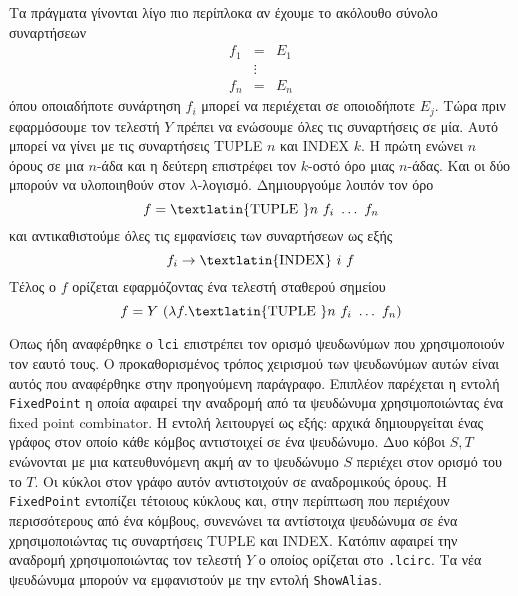 \documentclass[a4paper,11pt]{article}
\newcommand{\la}{$\lambda$}
\newcommand{\lci}{\texttt{\en{lci}}}
\newcommand{\kwd}[1]{\en{\texttt{#1}}}
\newcommand{\en}[1]{\textlatin{#1}}
\begin{document}
Τα πράγματα γίνονται λίγο πιο περίπλοκα αν έχουμε το ακόλουθο σύνολο συναρτήσεων
\begin{eqnarray*}
	f_1 & = & E_1 \\
	& \vdots \\
	f_n & = & E_n
\end{eqnarray*}
όπου οποιαδήποτε συνάρτηση $f_i$ μπορεί να περιέχεται σε οποιοδήποτε $E_j$. Τώρα
πριν εφαρμόσουμε τον τελεστή $Y$ πρέπει να ενώσουμε όλες τις συναρτήσεις σε μία.
Αυτό μπορεί να γίνει με τις συναρτήσεις \en{TUPLE} $n$ και \en{INDEX} $k$. Η πρώτη
ενώνει $n$ όρους σε μια $n$-άδα και η δεύτερη επιστρέφει τον $k$-οστό όρο μιας $n$-άδας.
Και οι δύο μπορούν να υλοποιηθούν στον \la-λογισμό. Δημιουργούμε λοιπόν τον όρο
\[ f = \textrm{\en{TUPLE }} n\ f_i \ \dots\ f_n \]
και αντικαθιστούμε όλες τις εμφανίσεις των συναρτήσεων ως εξής
\[ f_i \rightarrow \textrm{\en{INDEX}}\ i\ f \]
Τέλος ο $f$ ορίζεται εφαρμόζοντας ένα τελεστή σταθερού σημείου
\[ f = Y\ (\lambda f.\textrm{\en{TUPLE }} n\ f_i \ \dots\ f_n ) \]

Οπως ήδη αναφέρθηκε ο \lci{} επιστρέπει τον ορισμό ψευδωνύμων που χρησιμοποιούν τον
εαυτό τους. Ο προκαθορισμένος τρόπος χειρισμού των ψευδωνύμων αυτών είναι αυτός που
αναφέρθηκε στην προηγούμενη παράγραφο. Επιπλέον παρέχεται η εντολή \kwd{FixedPoint}
η οποία αφαιρεί την αναδρομή από τα ψευδώνυμα χρησιμοποιώντας ένα \en{fixed point
combinator}. Η εντολή λειτουργεί ως εξής:
αρχικά δημιουργείται ένας γράφος στον οποίο κάθε κόμβος αντιστοιχεί σε ένα ψευδώνυμο.
Δυο κόβοι $S,T$ ενώνονται με μια κατευθυνόμενη ακμή αν το ψευδώνυμο $S$ περιέχει στον
ορισμό του το $Τ$. Οι κύκλοι στον γράφο αυτόν αντιστοιχούν σε αναδρομικούς όρους.
Η \kwd{FixedPoint} εντοπίζει τέτοιους κύκλους και, στην περίπτωση που περιέχουν
περισσότερους από ένα κόμβους, συνενώνει τα αντίστοιχα ψευδώνυμα σε ένα χρησιμοποιώντας
τις συναρτήσεις \en{TUPLE} και \en{INDEX}. Κατόπιν αφαιρεί την αναδρομή χρησιμοποιώντας
τον τελεστή $Y$ ο οποίος ορίζεται στο \kwd{.lcirc}.
Τα νέα ψευδώνυμα μπορούν να εμφανιστούν με την εντολή \kwd{ShowAlias}.
\end{document}
